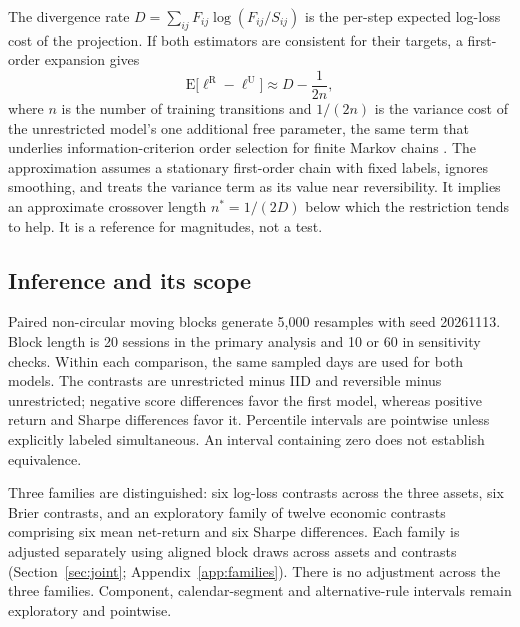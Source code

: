 The divergence rate $D=\sum_{ij}F_{ij}\log(F_{ij}/S_{ij})$ is the per-step expected log-loss cost of the projection. If both estimators are consistent for their targets, a first-order expansion gives
\begin{equation}
\mathrm E\bigl[\ell^{\mathrm R}-\ell^{\mathrm U}\bigr]\approx D-\frac{1}{2n},
\label{eq:refcost}
\end{equation}
where $n$ is the number of training transitions and $1/(2n)$ is the variance cost of the unrestricted model's one additional free parameter, the same term that underlies information-criterion order selection for finite Markov chains \citep{Tong1975}. The approximation assumes a stationary first-order chain with fixed labels, ignores smoothing, and treats the variance term as its value near reversibility. It implies an approximate crossover length $n^\ast=1/(2D)$ below which the restriction tends to help. It is a reference for magnitudes, not a test.

\subsection{Inference and its scope}
Paired non-circular moving blocks \citep{Kunsch1989} generate 5,000 resamples with seed 20261113. Block length is 20 sessions in the primary analysis and 10 or 60 in sensitivity checks. Within each comparison, the same sampled days are used for both models. The contrasts are unrestricted minus IID and reversible minus unrestricted; negative score differences favor the first model, whereas positive return and Sharpe differences favor it. Percentile intervals are pointwise unless explicitly labeled simultaneous. An interval containing zero does not establish equivalence.

Three families are distinguished: six log-loss contrasts across the three assets, six Brier contrasts, and an exploratory family of twelve economic contrasts comprising six mean net-return and six Sharpe differences. Each family is adjusted separately using aligned block draws across assets and contrasts (Section~\ref{sec:joint}; Appendix~\ref{app:families}). There is no adjustment across the three families. Component, calendar-segment and alternative-rule intervals remain exploratory and pointwise.

